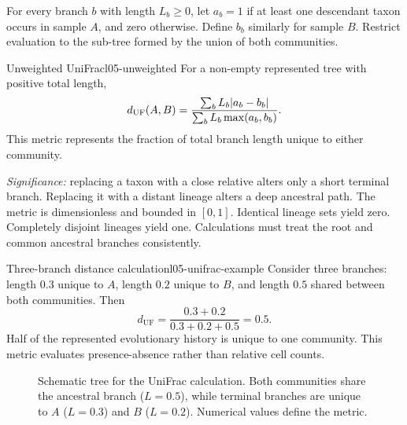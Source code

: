 For every branch $b$ with length $L_b\geq0$, let $a_b=1$ if at least one descendant taxon occurs in sample $A$, and zero otherwise. Define $b_b$ similarly for sample $B$. Restrict evaluation to the sub-tree formed by the union of both communities.
\begin{definition}{Unweighted UniFrac}{l05-unweighted}
For a non-empty represented tree with positive total length,
\begin{equation}
d_{\mathrm{UF}}(A,B)
=\frac{\sum_b L_b\lvert a_b-b_b\rvert}
       {\sum_b L_b\max(a_b,b_b)}.
\label{eq:l05-unifrac}
\end{equation}
This metric represents the fraction of total branch length unique to either community.
\end{definition}
\textit{Significance:} replacing a taxon with a close relative alters only a short terminal branch. Replacing it with a distant lineage alters a deep ancestral path. The metric is dimensionless and bounded in $[0, 1]$. Identical lineage sets yield zero. Completely disjoint lineages yield one. Calculations must treat the root and common ancestral branches consistently.

\begin{example}{Three-branch distance calculation}{l05-unifrac-example}
Consider three branches: length $0.3$ unique to $A$, length $0.2$ unique to $B$, and length $0.5$ shared between both communities. Then
\begin{equation}
d_{\mathrm{UF}}=\frac{0.3+0.2}{0.3+0.2+0.5}=0.5.
\label{eq:l05-unifrac-half}
\end{equation}
Half of the represented evolutionary history is unique to one community. This metric evaluates presence-absence rather than relative cell counts.
\end{example}

\begin{figure}[htbp]
\centering
{}
\caption{Schematic tree for the UniFrac calculation. Both communities share the ancestral branch ($L=0.5$), while terminal branches are unique to $A$ ($L=0.3$) and $B$ ($L=0.2$). Numerical values define the metric.}
\label{fig:l05-unifrac-tree}
\end{figure}

